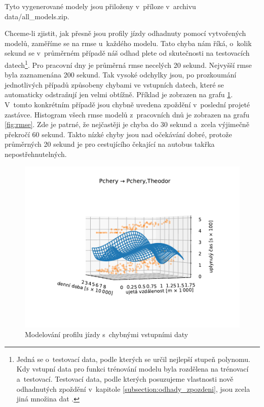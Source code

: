 \bigbreak

Tyto vygenerované modely jsou přiloženy v~příloze v~archivu data/all\allowbreak\_models\allowbreak.zip.

\bigbreak

Chceme-li zjistit, jak přesně jsou profily jízdy odhadnuty pomocí vytvořených modelů, zaměříme se na \gls{rmse} u~každého modelu. Tato chyba nám říká, o~kolik sekund se v~průměrném případě náš odhad plete od skutečnosti na testovacích datech\footnote{Jedná se o~testovací data, podle kterých se určil nejlepší stupeň polynomu. Kdy vstupní data pro funkci trénování modelu byla rozdělena na trénovací a~testovací. Testovací data, podle kterých posuzujeme vlastnosti nově odhadnutých zpoždění v~kapitole \ref{subsection:odhady_zpozdeni}, jsou zcela jiná množina dat \citep[viz][Strana 365, validation set a~test set]{Ripley96}.}. Pro pracovní dny je průměrná \gls{rmse} necelých 20 sekund. Nejvyšší \gls{rmse} byla zaznamenána 200 sekund. Tak vysoké odchylky jsou, po prozkoumání jednotlivých případů způsobeny chybami ve vstupních datech, které se automaticky odstraňují jen velmi obtížně. Příklad je zobrazen na grafu \ref{fig:chyba_zpozdeni_v_posledni_zastavce}. V~tomto konkrétním případě jsou chybně uvedena zpoždění v~poslední projeté zastávce. Histogram všech \gls{rmse} modelů z~pracovních dnů je zobrazen na grafu \ref{fig:rmse}. Zde je patrné, že nejčastěji je chyba do 30 sekund a~zcela výjimečně překročí 60 sekund. Takto nízké chyby jsou nad očekávání dobré, protože průměrných 20 sekund je pro cestujícího čekající na autobus takřka nepostřehnutelných.


\begin{figure}
   \centering
 \includegraphics[width=\linewidth]{../img/134_135}
 \caption{Modelování profilu jízdy s~chybnými vstupními daty}
 \label{fig:chyba_zpozdeni_v_posledni_zastavce}
\end{figure}


